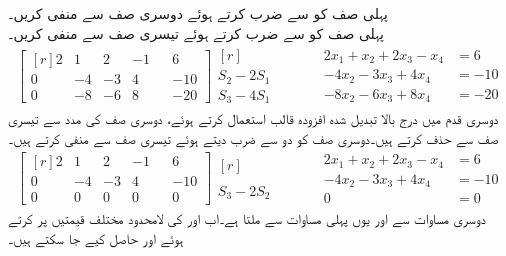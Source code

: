 پہلی صف کو  سے ضرب کرتے ہوئے دوسری صف سے منفی  کریں۔\\
پہلی صف کو  سے ضرب کرتے ہوئے تیسری صف سے منفی  کریں۔
\begin{gather*}
\begin{bmatrix*}[r]2&1&2&-1&&6\\0&-4&-3&4&&-10 \\0&-8&-6&8&&-20\end{bmatrix*}\begin{matrix*}[r]  \\S_2-2S_1\\S_3-4S_1  \end{matrix*}\quad\quad \quad
\begin{aligned}
2x_1+x_2+2x_3-x_4&=6\\
-4x_2-3x_3+4x_4&=-10\\
-8x_2-6x_3+8x_4&=-20
\end{aligned}
\end{gather*}
دوسری قدم میں درج بالا تبدیل شدہ افزودہ قالب استعمال کرتے ہوئے، دوسری  صف کی مدد سے تیسری صف سے  حذف کرتے ہیں۔دوسری صف کو دو سے ضرب دیتے ہوئے تیسری صف سے منفی کرتے ہیں۔
\begin{gather*}
\begin{bmatrix*}[r]2&1&2&-1&&6\\0&-4&-3&4&&-10 \\0&0&0&0&&0\end{bmatrix*}\begin{matrix*}[r]  \\\\S_3-2S_2  \end{matrix*}\quad\quad \quad
\begin{aligned}
2x_1+x_2+2x_3-x_4&=6\\
-4x_2-3x_3+4x_4&=-10\\
0&=0
\end{aligned}
\end{gather*}
دوسری مساوات سے  اور یوں پہلی مساوات سے  ملتا  ہے۔اب  اور  کی لامحدود مختلف قیمتیں پر کرتے ہوئے  اور  حاصل کیے جا سکتے ہیں۔

